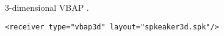 3-dimensional VBAP \cite{Pulkki1997}.

\begin{lstlisting}[numbers=none]
<receiver type="vbap3d" layout="spkeaker3d.spk"/>
\end{lstlisting}


